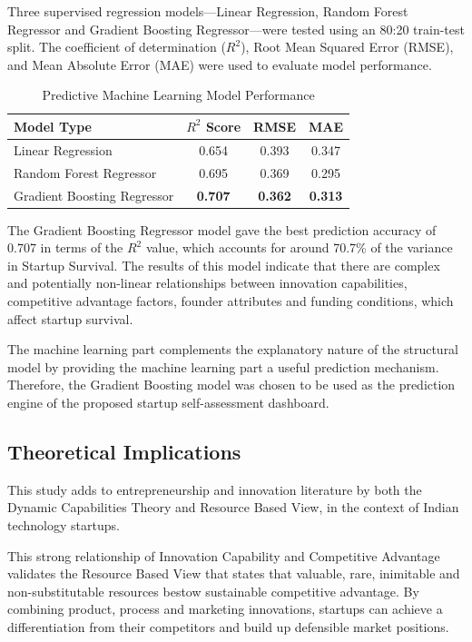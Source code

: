 \documentclass{ieeeaccess}
\begin{document}
Three supervised regression models—Linear Regression, Random Forest Regressor and Gradient Boosting Regressor—were tested using an 80:20 train-test split. The coefficient of determination ($R^2$), Root Mean Squared Error (RMSE), and Mean Absolute Error (MAE) were used to evaluate model performance.

\begin{table}[htbp]
\caption{Predictive Machine Learning Model Performance}
\label{tab:ml_results}
\centering
\begin{tabular}{lccc}
\hline
\textbf{Model Type} & \textbf{$R^2$ Score} & \textbf{RMSE} & \textbf{MAE} \\
\hline
Linear Regression & 0.654 & 0.393 & 0.347 \\
Random Forest Regressor & 0.695 & 0.369 & 0.295 \\
Gradient Boosting Regressor & \textbf{0.707} & \textbf{0.362} & \textbf{0.313} \\
\hline
\end{tabular}
\end{table}

The Gradient Boosting Regressor model gave the best prediction accuracy of 0.707 in terms of the $R^2$ value, which accounts for around 70.7\% of the variance in Startup Survival. The results of this model indicate that there are complex and potentially non-linear relationships between innovation capabilities, competitive advantage factors, founder attributes and funding conditions, which affect startup survival.

The machine learning part complements the explanatory nature of the structural model by providing the machine learning part a useful prediction mechanism. Therefore, the Gradient Boosting model was chosen to be used as the prediction engine of the proposed startup self-assessment dashboard.

\subsection{Theoretical Implications}

This study adds to entrepreneurship and innovation literature by both the Dynamic Capabilities Theory and Resource Based View, in the context of Indian technology startups.

This strong relationship of Innovation Capability and Competitive Advantage validates the Resource Based View that states that valuable, rare, inimitable and non-substitutable resources bestow sustainable competitive advantage. By combining product, process and marketing innovations, startups can achieve a differentiation from their competitors and build up defensible market positions.
\end{document}
